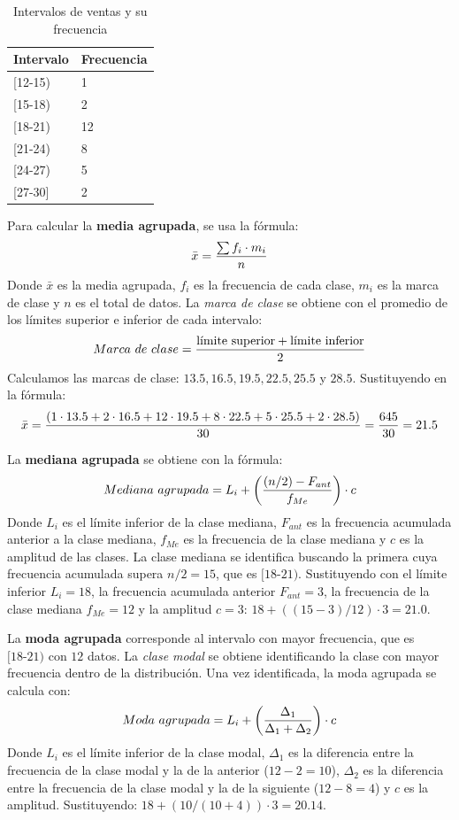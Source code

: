 \documentclass[12pt]{article}
\begin{document}
\begin{table}[h!]
    \begin{center}
        \begin{tabular}{|l|l|}
            \hline
            Intervalo & Frecuencia \\
            \hline
            {[}12-15) & 1 \\
            {[}15-18) & 2 \\
            {[}18-21) & 12 \\
            {[}21-24) & 8 \\
            {[}24-27) & 5 \\
            {[}27-30{]} & 2 \\
            \hline
        \end{tabular}
        \caption{Intervalos de ventas y su frecuencia}
        \label{tab:tabla_intervalos_ventas}
    \end{center}
\end{table}

Para calcular la \textbf{media agrupada}, se usa la fórmula:
\[\bar{x} = {{\sum{f_i \cdot m_i}} \over n}\]
Donde $\bar{x}$ es la media agrupada, $f_i$ es la frecuencia de cada clase, $m_i$ es la marca de clase y $n$ es el total de datos. La \textit{marca de clase} se obtiene con el promedio de los límites superior e inferior de cada intervalo:
\[Marca\ de\ clase = {{\text{límite superior} + \text{límite inferior}} \over 2}\]
Calculamos las marcas de clase: $13.5, 16.5, 19.5, 22.5, 25.5$ y $28.5$. Sustituyendo en la fórmula:
\[\bar{x} = {(1 \cdot 13.5 + 2 \cdot 16.5 + 12 \cdot 19.5 + 8 \cdot 22.5 + 5 \cdot 25.5 + 2 \cdot 28.5) \over 30} = {645 \over 30} = 21.5\]

La \textbf{mediana agrupada} se obtiene con la fórmula:
\[Mediana\ agrupada = L_i + \left({{(n/2) - F_{ant}} \over f_{Me}}\right) \cdot c\]
Donde $L_i$ es el límite inferior de la clase mediana, $F_{ant}$ es la frecuencia acumulada anterior a la clase mediana, $f_{Me}$ es la frecuencia de la clase mediana y $c$ es la amplitud de las clases. La clase mediana se identifica buscando la primera cuya frecuencia acumulada supera $n/2 = 15$, que es $[18\text{-}21)$. Sustituyendo con el límite inferior $L_i = 18$, la frecuencia acumulada anterior $F_{ant} = 3$, la frecuencia de la clase mediana $f_{Me} = 12$ y la amplitud $c = 3$: $18 + ((15 - 3)/12) \cdot 3 = 21.0$.

La \textbf{moda agrupada} corresponde al intervalo con mayor frecuencia, que es $[18\text{-}21)$ con $12$ datos. La \textit{clase modal} se obtiene identificando la clase con mayor frecuencia dentro de la distribución. Una vez identificada, la moda agrupada se calcula con:
\[Moda\ agrupada = L_i + \left({\Delta_1 \over \Delta_1 + \Delta_2}\right) \cdot c\]
Donde $L_i$ es el límite inferior de la clase modal, $\Delta_1$ es la diferencia entre la frecuencia de la clase modal y la de la anterior ($12 - 2 = 10$), $\Delta_2$ es la diferencia entre la frecuencia de la clase modal y la de la siguiente ($12 - 8 = 4$) y $c$ es la amplitud. Sustituyendo: $18 + (10/(10+4)) \cdot 3 = 20.14$.
\end{document}
